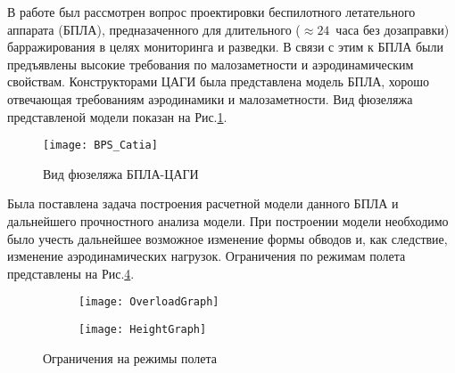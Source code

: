 В работе был рассмотрен вопрос проектировки беспилотного летательного аппарата (БПЛА), предназаченного для длительного ($\approx24$~часа без дозаправки) барражирования в целях мониторинга и разведки. В связи с этим к БПЛА были предъявлены высокие требования по малозаметности и аэродинамическим свойствам. Конструкторами ЦАГИ была представлена модель БПЛА, хорошо отвечающая требованиям аэродинамики и малозаметности. Вид фюзеляжа представленой модели показан на Рис.\ref{fig:BPLA_TSAGI}. 

\begin{figure}[H]
\centering
\texttt{[image: BPS\_Catia]}
\caption{Вид фюзеляжа БПЛА-ЦАГИ}
\label{fig:BPLA_TSAGI}
\end{figure}

Была поставлена задача построения расчетной модели данного БПЛА и дальнейшего прочностного анализа модели. При построении модели необходимо было учесть дальнейшее возможное изменение формы обводов и, как следствие, изменение аэродинамических нагрузок. Ограничения по режимам полета представлены на Рис.\ref{fig:ModeOfFlight}.
 
  
  
  
  
\begin{figure}[H]
\begin{subfigure}[b]{0.47\textwidth}
\texttt{[image: OverloadGraph]}
\label{fig:OverloadGraph}
\end{subfigure}
\begin{subfigure}[b]{0.47\textwidth}
\texttt{[image: HeightGraph]}
\label{fig:HeightGraph}
\end{subfigure}
\caption{Ограничения на режимы полета}
\label{fig:ModeOfFlight}
\end{figure}

%

